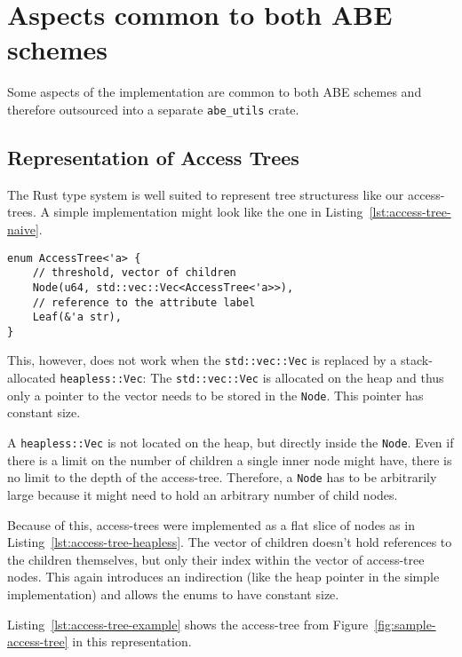 \section{Aspects common to both ABE schemes}

Some aspects of the implementation are common to both ABE schemes and therefore outsourced into a separate \verb+abe_utils+ \gls{crate}.

\subsection{Representation of Access Trees}
The Rust type system is well suited to represent tree structuress like our \glspl{access-tree}.
A simple implementation might look like the one in Listing~\ref{lst:access-tree-naive}. 

\begin{lstlisting}[float=h!,caption={Simple Implementation of \glspl{access-tree} (using the standard library)},label={lst:access-tree-naive}]
enum AccessTree<'a> {
    // threshold, vector of children
    Node(u64, std::vec::Vec<AccessTree<'a>>),
    // reference to the attribute label
    Leaf(&'a str),
}
\end{lstlisting}

This, however, does not work when the \texttt{std::vec::Vec} is replaced by a stack-allocated \texttt{heapless::Vec}:
The \texttt{std::vec::Vec} is allocated on the heap and thus only a pointer to the vector needs to be stored in the \texttt{Node}.
This pointer has constant size.

A \texttt{heapless::Vec} is not located on the heap, but directly inside the \texttt{Node}.
Even if there is a limit on the number of children a single inner node might have, there is no limit to the depth of the \gls{access-tree}.
Therefore, a \texttt{Node} has to be arbitrarily large because it might need to hold an arbitrary number of child nodes.

Because of this, \glspl{access-tree} were implemented as a flat \gls{slice} of nodes as in Listing~\ref{lst:access-tree-heapless}. 
The vector of children doesn't hold references to the children themselves, but only their index within the vector of \gls{access-tree} nodes.
This again introduces an indirection (like the heap pointer in the simple implementation) and allows the enums to have constant size.

Listing~\ref{lst:access-tree-example} shows the \gls{access-tree} from Figure~\ref{fig:sample-access-tree} in this representation.


